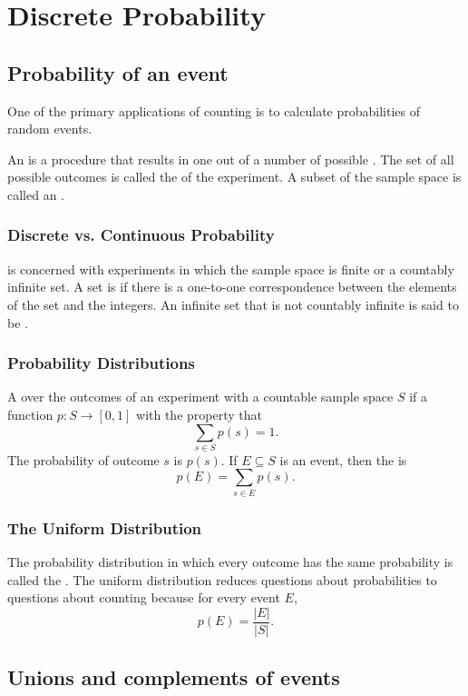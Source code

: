 \section{Discrete Probability}
\subsection{Probability of an event}
One of the primary applications of counting is to calculate probabilities of random events.

An  is a procedure that results in one out of a number of possible . The set of all possible outcomes is called the  of the experiment. A subset of the sample space is called an .

\subsubsection*{Discrete vs. Continuous Probability}
 is concerned with experiments in which the sample space is finite or a countably infinite set. A set is  if there is a one-to-one correspondence between the elements of the set and the integers. An infinite set that is not countably infinite is said to be .

\subsubsection*{Probability Distributions}
A  over the outcomes of an experiment with a countable sample space $S$ if a function $p: S \rightarrow [0,1]$ with the property that
\[
  \sum_{s \in S} p(s) = 1.
\]
The probability of outcome $s$ is $p(s)$. If $E \subseteq S$ is an event, then the  is
\[
  p(E) = \sum_{s \in E} p(s).
\]

\subsubsection*{The Uniform Distribution}
The probability distribution in which every outcome has the same probability is called the . The uniform distribution reduces questions about probabilities to questions about counting because for every event $E$,
\[
  p(E) = \frac{|E|}{|S|}.
\]

\subsection{Unions and complements of events}
